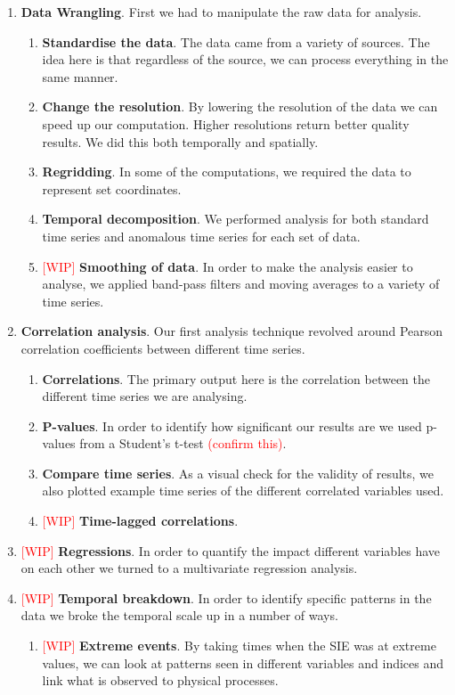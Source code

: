 \documentclass[../main.tex]{subfiles}
\begin{document}
\begin{enumerate}
    \item \textbf{Data Wrangling}. First we had to manipulate the raw data for analysis. 
    \begin{enumerate}
        \item \textbf{Standardise the data}. The data came from a variety of sources. The idea here is that regardless of the source, we can process everything in the same manner.
        \item \textbf{Change the resolution}. By lowering the resolution of the data we can speed up our computation. Higher resolutions return better quality results. We did this both temporally and spatially.
        \item \textbf{Regridding}. In some of the computations, we required the data to represent set coordinates.
        \item \textbf{Temporal decomposition}. We performed analysis for both standard time series and anomalous time series for each set of data.
        \item \textcolor{red}{[WIP]} \textbf{Smoothing of data}. In order to make the analysis easier to analyse, we applied band-pass filters and moving averages to a variety of time series. 
    \end{enumerate}
    \item \textbf{Correlation analysis}. Our first analysis technique revolved around Pearson correlation coefficients between different time series. 
    \begin{enumerate}
        \item \textbf{Correlations}. The primary output here is the correlation between the different time series we are analysing.
        \item \textbf{P-values}. In order to identify how significant our results are we used p-values from a Student's t-test \textcolor{red}{(confirm this)}.
        \item \textbf{Compare time series}. As a visual check for the validity of results, we also plotted example time series of the different correlated variables used.
        \item \textcolor{red}{[WIP]} \textbf{Time-lagged correlations}.
    \end{enumerate}
    \item \textcolor{red}{[WIP]} \textbf{Regressions}. In order to quantify the impact different variables have on each other we turned to a multivariate regression analysis.
    \item \textcolor{red}{[WIP]} \textbf{Temporal breakdown}. In order to identify specific patterns in the data we broke the temporal scale up in a number of ways.
    \begin{enumerate}
        \item \textcolor{red}{[WIP]} \textbf{Extreme events}. By taking times when the SIE was at extreme values, we can look at patterns seen in different variables and indices and link what is observed to physical processes.
    \end{enumerate}
\end{enumerate}
\end{document}
